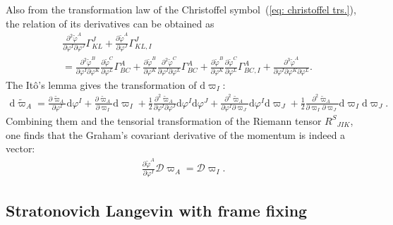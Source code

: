 \documentclass[aps, prd
, preprint
, nofootinbib 
, longbibliography
]{revtex4-1}
\newcommand{\pdif}[2]{\frac{\partial #1}{\partial #2}}
\newcommand{\ppdpdpd}[3]{\frac{\partial^2 #1}{\partial #2\partial #3}}
\newcommand{\pppdpdpdpd}[4]{\frac{\partial^3 #1}{\partial #2\partial #3\partial #4}}
\newcommand{\dd}{\mathrm{d}}
\newcommand{\calD}{\mathcal{D}}
\newcommand{\bae}[1]{\begin{align} #1 \end{align}}
\begin{document}
Also from the transformation law of the Christoffel symbol~(\ref{eq: christoffel trs.}), the relation of its derivatives can be obtained as
\bae{\label{eq: dif. christoffel trs.}
	&\ppdpdpd{\tilde{\varphi}^A}{\varphi^I}{\varphi^J}\Gamma^J_{KL}+\pdif{\tilde{\varphi}^A}{\varphi^J}\Gamma^J_{KL,I} \nonumber \\
	&=\ppdpdpd{\tilde{\varphi}^B}{\varphi^I}{\varphi^K}\pdif{\tilde{\varphi}^C}{\varphi^L}\Gamma^A_{BC}
	+\pdif{\tilde{\varphi}^B}{\varphi^K}\ppdpdpd{\tilde{\varphi}^C}{\varphi^I}{\varphi^L}\Gamma^A_{BC}
	+\pdif{\tilde{\varphi}^B}{\varphi^K}\pdif{\tilde{\varphi}^C}{\varphi^L}\Gamma^A_{BC,I}+\pppdpdpdpd{\tilde{\varphi}^A}{\varphi^I}{\varphi^K}{\varphi^L}.
}
The It\^o's lemma gives the transformation of $\dd\varpi_I$:
\bae{
	\dd\tilde{\varpi}_A=\pdif{\tilde{\varpi}_A}{\varphi^I}\dd\varphi^I+\pdif{\tilde{\varpi}_A}{\varpi_I}\dd\varpi_I
	+\frac{1}{2}\ppdpdpd{\tilde{\varpi}_A}{\varphi^I}{\varphi^J}\dd\varphi^I\dd\varphi^J+\ppdpdpd{\tilde{\varpi}_A}{\varphi^I}{\varpi_J}\dd\varphi^I\dd\varpi_J
	+\frac{1}{2}\ppdpdpd{\tilde{\varpi}_A}{\varpi_I}{\varpi_J}\dd\varpi_I\dd\varpi_J.
}
Combining them and the tensorial transformation of the Riemann tensor $R^S{}_{JIK}$, one finds that the Graham's covariant derivative of the momentum is indeed a vector:
\bae{
	\pdif{\tilde{\varphi}^A}{\varphi^I}\calD\varpi_A=\calD\varpi_I.
}


\subsection{Stratonovich Langevin with frame fixing}
\end{document}
